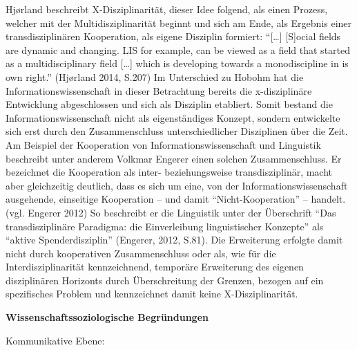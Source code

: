 \documentclass[a4paper,
fontsize=11pt,
oneside,
numbers=noperiodatend,
parskip=half-,
bibliography=totoc,
final
]{scrartcl}
\begin{document}
Hjørland beschreibt X-Disziplinarität, dieser Idee folgend, als einen
Prozess, welcher mit der Multidisziplinarität beginnt und sich am Ende,
als Ergebnis einer transdisziplinären Kooperation, als eigene Disziplin
formiert: \enquote{{[}\ldots{}{]} {[}S{]}ocial fields are dynamic and
changing. LIS for example, can be viewed as a field that started as a
multidisciplinary field {[}\ldots{}{]} which is developing towards a
monodiscipline in is own right.} (Hjørland 2014, S.207) Im Unterschied
zu Hobohm hat die Informationswissenschaft in dieser Betrachtung bereits
die x-disziplinäre Entwicklung abgeschlossen und sich als Disziplin
etabliert. Somit bestand die Informationswissenschaft nicht als
eigenständiges Konzept, sondern entwickelte sich erst durch den
Zusammenschluss unterschiedlicher Disziplinen über die Zeit. Am Beispiel
der Kooperation von Informationswissenschaft und Linguistik beschreibt
unter anderem Volkmar Engerer einen solchen Zusammenschluss. Er
bezeichnet die Kooperation als inter- beziehungsweise transdisziplinär,
macht aber gleichzeitig deutlich, dass es sich um eine, von der
Informationswissenschaft ausgehende, einseitige Kooperation -- und damit
\enquote{Nicht-Kooperation} -- handelt. (vgl. Engerer 2012) So
beschreibt er die Linguistik unter der Überschrift \enquote{Das
transdisziplinäre Paradigma: die Einverleibung linguistischer Konzepte}
als \enquote{aktive Spenderdisziplin} (Engerer, 2012, S.81). Die
Erweiterung erfolgte damit nicht durch kooperativen Zusammenschluss oder
als, wie für die Interdisziplinarität kennzeichnend, temporäre
Erweiterung des eigenen disziplinären Horizonts durch Überschreitung der
Grenzen, bezogen auf ein spezifisches Problem und kennzeichnet damit
keine X-Disziplinarität.

\textbf{Wissenschaftssoziologische Begründungen}

Kommunikative Ebene:
\end{document}
